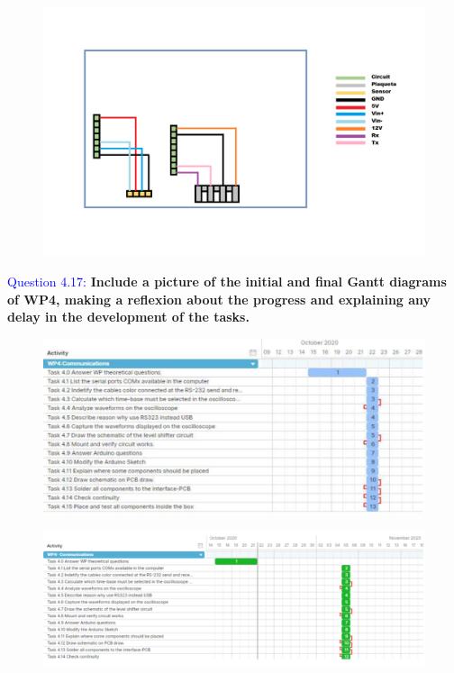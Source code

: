\documentclass[12pt, a4papre]{article}
\begin{document}
	\begin{figure}[H]
		\begin{center}
		\includegraphics[width=120mm]{placa2_entic.png}
		\end{center}
	\end{figure}

	\textcolor{blue}{Question 4.17:} \textbf{Include a picture of the initial and final Gantt diagrams of WP4, making a reflexion about the progress and explaining any delay in the development of the tasks.}
	
	\begin{figure}[H]
		\begin{center}
		\includegraphics[width=135mm]{WP4_ini}
		\end{center}
	\end{figure}
	\begin{figure}[H]
		\begin{center}
		\includegraphics[width=135mm]{WP4_fin}
		\end{center}
	\end{figure}
	
\end{document}
